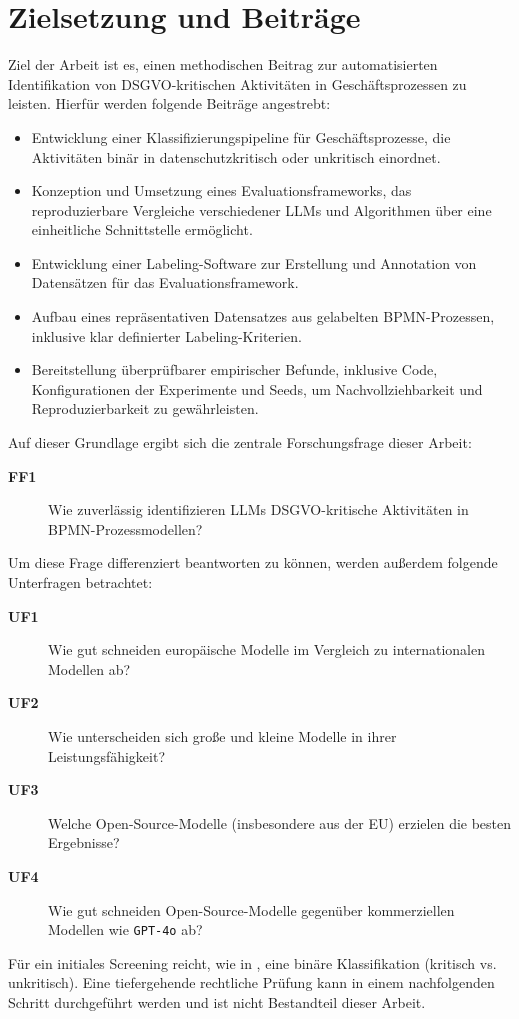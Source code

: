 \section{Zielsetzung und Beiträge}\label{sec:zielsetzung-und-beitrage}

Ziel der Arbeit ist es, einen methodischen Beitrag zur automatisierten Identifikation von \ac{DSGVO}-kritischen Aktivitäten in Geschäftsprozessen zu leisten. Hierfür werden folgende Beiträge angestrebt:

\begin{itemize}
    \item Entwicklung einer Klassifizierungspipeline für Geschäftsprozesse, die Aktivitäten binär in datenschutzkritisch oder unkritisch einordnet.
    \item Konzeption und Umsetzung eines Evaluationsframeworks, das reproduzierbare Vergleiche verschiedener \acp{LLM} und Algorithmen über eine einheitliche Schnittstelle ermöglicht.
    \item Entwicklung einer Labeling-Software zur Erstellung und Annotation von Datensätzen für das Evaluationsframework.
    \item Aufbau eines repräsentativen Datensatzes aus gelabelten \ac{BPMN}-Prozessen, inklusive klar definierter Labeling-Kriterien.
    \item Bereitstellung überprüfbarer empirischer Befunde, inklusive Code, Konfigurationen der Experimente und Seeds, um Nachvollziehbarkeit und Reproduzierbarkeit zu gewährleisten.
\end{itemize}

Auf dieser Grundlage ergibt sich die zentrale Forschungsfrage dieser Arbeit:

\begin{description}
    \item[\textbf{FF1}] Wie zuverlässig identifizieren \acp{LLM} \ac{DSGVO}-kritische Aktivitäten in \ac{BPMN}-Prozessmodellen?
\end{description}

Um diese Frage differenziert beantworten zu können, werden außerdem folgende Unterfragen betrachtet:

\begin{description}
    \item[\textbf{UF1}] Wie gut schneiden europäische Modelle im Vergleich zu internationalen Modellen ab?
    \item[\textbf{UF2}] Wie unterscheiden sich große und kleine Modelle in ihrer Leistungsfähigkeit?
    \item[\textbf{UF3}] Welche Open-Source-Modelle (insbesondere aus der \ac{EU}) erzielen die besten Ergebnisse?
    \item[\textbf{UF4}] Wie gut schneiden Open-Source-Modelle gegenüber kommerziellen Modellen wie \texttt{GPT-4o} ab?
\end{description}

Für ein initiales Screening reicht, wie in \cite{nake2023towards}, eine binäre Klassifikation (kritisch vs. unkritisch). Eine tiefergehende rechtliche Prüfung kann in einem nachfolgenden Schritt durchgeführt werden und ist nicht Bestandteil dieser Arbeit.